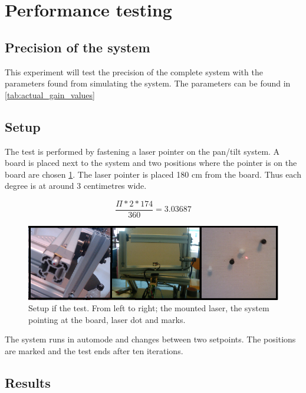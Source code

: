 \section{Performance testing}

\subsection{Precision of the system}\label{subsec:precisionofsystem}
This experiment will test the precision of the complete system with the
parameters found from simulating the system. The parameters can be found in
\ref{tab:actual_gain_values}

\subsection*{Setup}

The test is performed by fastening a laser pointer on the pan/tilt system. A
board is placed next to the system and two positions where the pointer is on the
board are chosen \ref{fig:systemtestsetup}. The laser pointer is placed 180 cm
from the board. Thus each degree is at around 3 centimetres wide.

\[ \frac{\Pi*2*174}{360} = 3.03687 \]


\begin{figure}[htb] \centering \includegraphics[width=\textwidth,trim=0 0 0
0]{graphics/overallsystemtest.png} %
	\caption{Setup if the test. From left to right; the mounted laser, the system pointing at the board, laser dot and marks.}
	\label{fig:systemtestsetup}			%
\end{figure}

The system runs in automode and changes between two setpoints. The positions
are marked and the test ends after ten iterations. 

\subsection*{Results}

